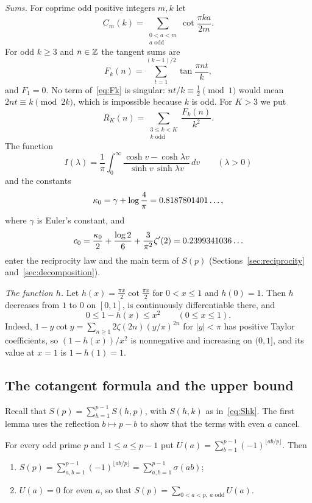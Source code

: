 \emph{Sums.} For coprime odd positive integers $m,k$ let
\[
C_m(k)=\sum_{\substack{0<a<m\\ a\text{ odd}}}\cot\frac{\pi ka}{2m}.
\]
For odd $k\ge3$ and $n\in\mathbb{Z}$ the tangent sums are
\begin{equation}\label{eq:Fk}
F_k(n)=\sum_{t=1}^{(k-1)/2}\tan\frac{\pi nt}k,
\end{equation}
and $F_1=0$. No term of~\eqref{eq:Fk} is singular: $nt/k\equiv\frac12\pmod1$ would mean $2nt\equiv k\pmod{2k}$, which is impossible because $k$ is odd. For $K>3$ we put
\[
R_K(n)=\sum_{\substack{3\le k<K\\ k\text{ odd}}}\frac{F_k(n)}{k^2}.
\]
The function
\begin{equation}\label{eq:I}
I(\lambda)=\frac1\pi\int_0^\infty\frac{\cosh v-\cosh\lambda v}{\sinh v\,\sinh\lambda v}\,dv\qquad(\lambda>0)
\end{equation}
and the constants
\begin{equation}\label{eq:K0}
\kappa_0=\gamma+\log\frac4\pi=0.8187801401\ldots,
\end{equation}
where $\gamma$ is Euler's constant, and
\begin{equation}\label{eq:c0}
c_0=\frac{\kappa_0}2+\frac{\log2}6+\frac3{\pi^2}\zeta'(2)=0.2399341036\ldots
\end{equation}
enter the reciprocity law and the main term of $S(p)$ (Sections~\ref{sec:reciprocity} and~\ref{sec:decomposition}).

\emph{The function $h$.} Let $h(x)=\frac{\pi x}2\cot\frac{\pi x}2$ for $0<x\le1$ and $h(0)=1$. Then $h$ decreases from $1$ to $0$ on $[0,1]$, is continuously differentiable there, and
\[
0\le1-h(x)\le x^2\qquad(0\le x\le1).
\]
Indeed, $1-y\cot y=\sum_{n\ge1}2\zeta(2n)(y/\pi)^{2n}$ for $|y|<\pi$ has positive Taylor coefficients, so $(1-h(x))/x^2$ is nonnegative and increasing on $(0,1]$, and its value at $x=1$ is $1-h(1)=1$.

\subsection{The cotangent formula and the upper bound}
Recall that $S(p)=\sum_{h=1}^{p-1}S(h,p)$, with $S(h,k)$ as in~\eqref{eq:Shk}. The first lemma uses the reflection $b\mapsto p-b$ to show that the terms with even $a$ cancel.

\begin{lemma}\label{lem:elementary}
For every odd prime $p$ and $1\le a\le p-1$ put $U(a)=\sum_{b=1}^{p-1}(-1)^{\lfloor ab/p\rfloor}$. Then
\begin{enumerate}[label=\upshape(\alph*),leftmargin=*,nosep]
\item $S(p)=\sum_{a,b=1}^{p-1}(-1)^{\lfloor ab/p\rfloor}=\sum_{a,b=1}^{p-1}\sigma(ab)$;
\item $U(a)=0$ for even $a$, so that $S(p)=\sum_{0<a<p,\ a\text{ odd}}U(a)$.
\end{enumerate}
\end{lemma}

